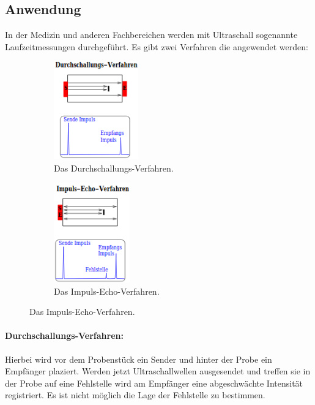 \documentclass[titlepage = firstcover]{scrartcl}
\begin{document}
      \subsection{Anwendung}
        In der Medizin und anderen Fachbereichen werden mit Ultraschall sogenannte Laufzeitmessungen durchgeführt.
        Es gibt zwei Verfahren die angewendet werden:
        \begin{figure}[h]
          \centering
          \begin{subfigure}{0.48\textwidth}
            \centering
            \includegraphics[width = 0.4\textwidth]{Bilder/Durchschallungsverfahren.png}
            \caption{Das Durchschallungs-Verfahren.}
            \label{fig:Durchschallungsverfahren}
          \end{subfigure}
          \begin{subfigure}{0.48\textwidth}
            \centering
            \includegraphics[width = 0.36\textwidth]{Bilder/Impulsechoverfahren.png}
            \caption{Das Impuls-Echo-Verfahren.}
            \label{fig:Impulsechoverfahren}
          \end{subfigure}
        \end{figure}

        \FloatBarrier

        \paragraph{Durchschallungs-Verfahren:}
          Hierbei wird vor dem Probenstück ein Sender und hinter der Probe ein Empfänger plaziert. Werden jetzt Ultraschallwellen ausgesendet und treffen sie in der Probe auf eine Fehlstelle wird am Empfänger eine abgeschwächte Intensität registriert. Es ist nicht möglich die Lage der Fehlstelle zu bestimmen.
\end{document}
